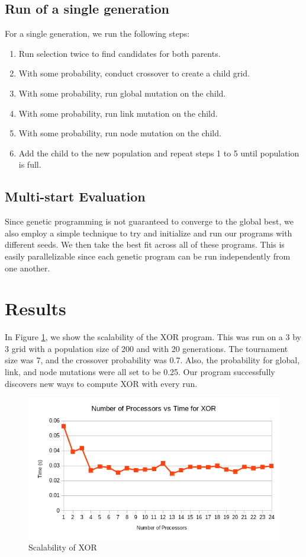 \documentclass[12pt,conference]{IEEEtran}
\begin{document}
	\subsection{Run of a single generation}
For a single generation, we run the following steps:
\begin{enumerate}
\item Run selection twice to find candidates for both parents.
\item With some probability, conduct crossover to create a child grid.
\item With some probability, run global mutation on the child.
\item With some probability, run link mutation on the child.
\item With some probability, run node mutation on the child.
\item Add the child to the new population and repeat steps 1 to 5 until population is full.
\end{enumerate}

	\subsection{Multi-start Evaluation}
	Since genetic programming is not guaranteed to converge to the global best, we also employ a simple technique to try and initialize and run our programs with different seeds. We then take the best fit across all of these programs. This is easily parallelizable since each genetic program can be run independently from one another. 
	
	\section{Results}
	In Figure \ref{xor_scalability}, we show the scalability of the XOR program. This was run on a 3 by 3 grid with a population size of 200 and with 20 generations. The tournament size was 7, and the crossover probability was 0.7. Also, the probability for global, link, and node mutations were all set to be 0.25. Our program successfully discovers new ways to compute XOR with every run.
\begin{figure}
	\centering
	\includegraphics{xor_scalability.png}
	\caption{Scalability of XOR}
	\label{xor_scalability}
\end{figure}
	
\end{document}
